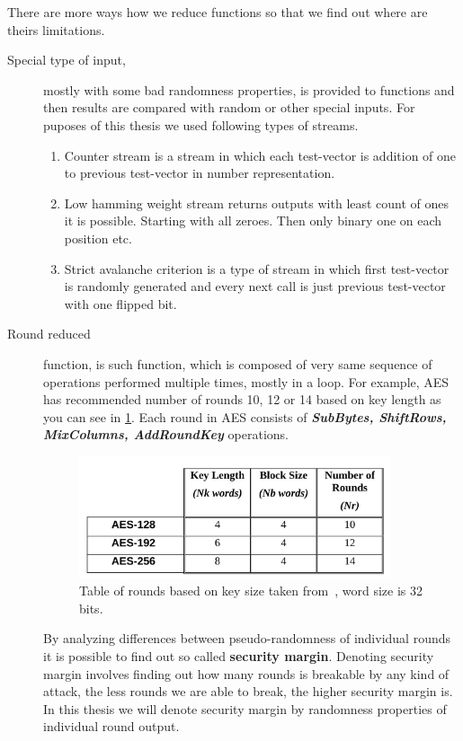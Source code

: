 \documentclass[
    digital,    %
    oneside,    %
    color,
    11pt,
    nocover,
    notable,
    nolof,
    nolot,
    final
]{fithesis3}
\begin{document}
There are more ways how we reduce functions so that we find out where are theirs limitations. 

\begin{description}
	\item[Special type of input,] mostly with some bad randomness properties, is provided to functions and then results are compared with random or other special inputs. For puposes of this thesis we used following types of streams.
	\begin{enumerate}
		\item Counter stream is a stream in which each test-vector is addition of one to previous test-vector in number representation.
		\item Low hamming weight stream returns outputs with least count of ones it is possible. Starting with all zeroes. Then only binary one on each position etc.
		\item Strict avalanche criterion is a type of stream in which first test-vector is randomly generated and every next call is just previous test-vector with one flipped bit.
	\end{enumerate}


	\item[Round reduced] function, is such function, which is composed of very same sequence of operations performed multiple times, mostly in a loop. For example, AES~\cite{FIPS-197} has recommended number of rounds 10, 12 or 14 based on key length as you can see in \cref{fig:fips197-rounds}. Each round in AES consists of \textbf{\textit{SubBytes, ShiftRows, MixColumns, AddRoundKey}} operations.
	
	\begin{figure}[h]
		\centering
		\includegraphics[width=0.9\textwidth]{./images/pictures/FIPS197-Nr-table.png}
		\caption{Table of rounds based on key size taken from~\cite{FIPS-197}, word size is 32 bits.}
		\label{fig:fips197-rounds}
	\end{figure}

	By analyzing differences between pseudo-randomness of individual rounds it is possible to find out so called \textbf{security margin}. Denoting security margin involves finding out how many rounds is breakable by any kind of attack, the less rounds we are able to break, the higher security margin is. In this thesis we will denote security margin by randomness properties of individual round output.
	

\end{description}
\end{document}
